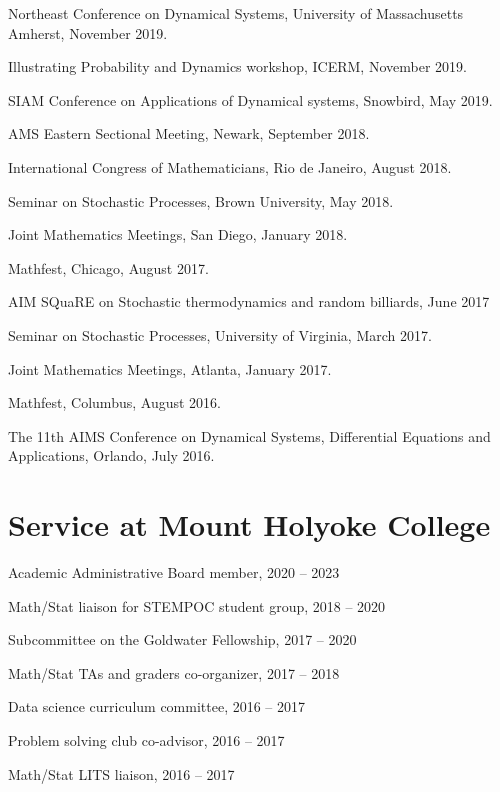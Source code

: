 \documentclass[10pt,letterpaper]{article}
\renewenvironment{itemize}{
  \begin{list}{}{
    \setlength{\leftmargin}{1.5em}
    \setlength{\itemsep}{0.25em}
    \setlength{\parskip}{0pt}
    \setlength{\parsep}{0.25em}
  }
}{
  \end{list}
}
\providecommand{\tightlist}{%
  \setlength{\itemsep}{0pt}\setlength{\parskip}{0pt}}
\let\tightlist\relax
\begin{document}
\begin{itemize}
\item
  Northeast Conference on Dynamical Systems, University of Massachusetts
  Amherst, November 2019.
\item
  Illustrating Probability and Dynamics workshop, ICERM, November 2019.
\item
  SIAM Conference on Applications of Dynamical systems, Snowbird, May
  2019.
\item
  AMS Eastern Sectional Meeting, Newark, September 2018.
\item
  International Congress of Mathematicians, Rio de Janeiro, August 2018.
\item
  Seminar on Stochastic Processes, Brown University, May 2018.
\item
  Joint Mathematics Meetings, San Diego, January 2018.
\item
  Mathfest, Chicago, August 2017.
\item
  AIM SQuaRE on Stochastic thermodynamics and random billiards, June
  2017
\item
  Seminar on Stochastic Processes, University of Virginia, March 2017.
\item
  Joint Mathematics Meetings, Atlanta, January 2017.
\item
  Mathfest, Columbus, August 2016.
\item
  The 11th AIMS Conference on Dynamical Systems, Differential Equations
  and Applications, Orlando, July 2016.
\end{itemize}

\hypertarget{service-at-mount-holyoke-college}{%
\section*{Service at Mount Holyoke
College}\label{service-at-mount-holyoke-college}}

\begin{itemize}
\tightlist
\item
  Academic Administrative Board member, 2020 -- 2023
\item
  Math/Stat liaison for STEMPOC student group, 2018 -- 2020
\item
  Subcommittee on the Goldwater Fellowship, 2017 -- 2020
\item
  Math/Stat TAs and graders co-organizer, 2017 -- 2018
\item
  Data science curriculum committee, 2016 -- 2017
\item
  Problem solving club co-advisor, 2016 -- 2017
\item
  Math/Stat LITS liaison, 2016 -- 2017
\end{itemize}
\end{document}
